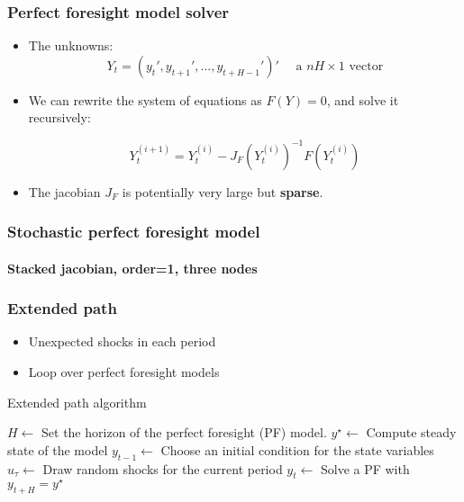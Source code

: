 \documentclass{beamer}
\begin{document}
\begin{frame}
   \frametitle{Perfect foresight model solver}

   \begin{itemize}

      \item The unknowns:\newline
            \[
               Y_t = (y_t', y_{t+1}',\ldots,y_{t+H-1}')' \quad\text{ a }nH\times 1\text{ vector}
            \]

            \bigskip

      \item We can rewrite the system of equations as $F(Y)=0$, and solve it recursively:\newline

            \[
               Y_t^{(i+1)} = Y_t^{(i)} - J_F\left(Y_t^{(i)}\right)^{-1} F\left(Y_t^{(i)}\right)
            \]
            \medskip

      \item The jacobian $J_F$ is potentially very large but \textbf{sparse}.

   \end{itemize}

\end{frame}


\begin{frame}
   \frametitle{Stochastic perfect foresight model}
   \framesubtitle{Stacked jacobian, order=1, three nodes}
   \begin{center}
      \scalebox{.5}{
         }
   \end{center}
\end{frame}


\begin{frame}
   \frametitle{Extended path}

   \begin{itemize}
      \item Unexpected shocks in each period\newline
      \item Loop over perfect foresight models\newline
   \end{itemize}

   \medskip

   \begin{algorithm}[H]
      \caption{Extended path algorithm}
      \label{alg:ep}
      \begin{algorithmic}[1]
         \STATE $H \leftarrow$ Set the horizon of the perfect foresight (PF) model.
         \STATE $y^\star \leftarrow$ Compute steady state of the model
         \STATE $y_{t-1} \leftarrow$ Choose an initial condition for the state variables
         \STATE $u_\tau  \leftarrow$ Draw random shocks for the current period
         \STATE $y_t \leftarrow$ Solve a PF with $y_{t+H}=y^{\star}$
         \ENDFOR
      \end{algorithmic}
   \end{algorithm}

\end{frame}
\end{document}
